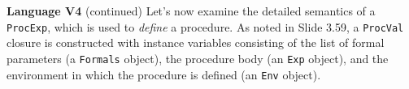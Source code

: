 \begin{minipage}[t]{\sw}
\slidenumber
\LARGE
{\bf Language V4} (continued)\exx
Let's now examine the detailed semantics of a \verb'ProcExp',
which is used to {\em define} a procedure.\exx
\Large
\emm{}\exx
\LARGE
As noted in Slide 3.59,
a \verb'ProcVal' closure is constructed
with instance variables consisting of
the list of formal parameters (a \verb'Formals' object),
the procedure body (an \verb'Exp' object),
and the environment in which the procedure is defined
(an \verb'Env' object).\exx
\end{minipage}

\clearpage
